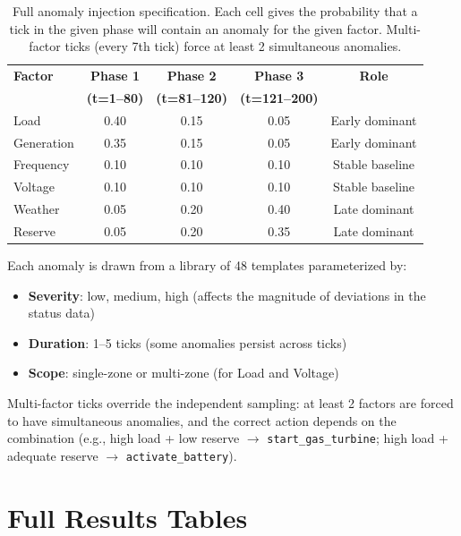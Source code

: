 \documentclass{article}
\begin{document}
\begin{table}[h]
\centering
\caption{Full anomaly injection specification. Each cell gives the
probability that a tick in the given phase will contain an anomaly for
the given factor. Multi-factor ticks (every 7th tick) force at least 2
simultaneous anomalies.}
\label{tab:anomaly_full}
\begin{tabular}{@{}lcccc@{}}
\toprule
\textbf{Factor} & \textbf{Phase 1} & \textbf{Phase 2} & \textbf{Phase
3} & \textbf{Role} \\
 & \textbf{(t=1--80)} & \textbf{(t=81--120)} & \textbf{(t=121--200)} & \\
\midrule
Load       & 0.40 & 0.15 & 0.05 & Early dominant \\
Generation & 0.35 & 0.15 & 0.05 & Early dominant \\
Frequency  & 0.10 & 0.10 & 0.10 & Stable baseline \\
Voltage    & 0.10 & 0.10 & 0.10 & Stable baseline \\
Weather    & 0.05 & 0.20 & 0.40 & Late dominant \\
Reserve    & 0.05 & 0.20 & 0.35 & Late dominant \\
\bottomrule
\end{tabular}
\end{table}

Each anomaly is drawn from a library of 48 templates parameterized by:
\begin{itemize}
    \item \textbf{Severity}: low, medium, high (affects the magnitude of
    deviations in the status data)
    \item \textbf{Duration}: 1--5 ticks (some anomalies persist across
    ticks)
    \item \textbf{Scope}: single-zone or multi-zone (for Load and
    Voltage)
\end{itemize}

Multi-factor ticks override the independent sampling: at least 2
factors are forced to have simultaneous anomalies, and the correct
action depends on the combination (e.g., high load + low reserve
$\rightarrow$ \texttt{start\_gas\_turbine}; high load + adequate reserve
$\rightarrow$ \texttt{activate\_battery}).

\section{Full Results Tables}
\label{app:results}
\end{document}

